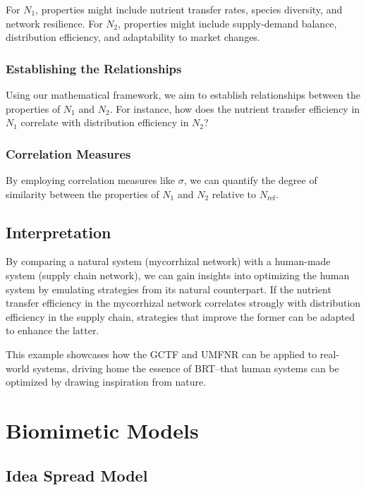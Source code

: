 \documentclass[sn-nature]{sn-jnl}%
\theoremstyle{thmstyleone}%
\theoremstyle{thmstyletwo}%
\theoremstyle{thmstylethree}%
\begin{document}
\begin{enumerate}
For \( N_1 \), properties might include nutrient transfer rates, species diversity, and network resilience.
For \( N_2 \), properties might include supply-demand balance, distribution efficiency, and adaptability to market changes.

\subsubsection*{Establishing the Relationships}

Using our mathematical framework, we aim to establish relationships between the properties of \( N_1 \) and \( N_2 \). For instance, how does the nutrient transfer efficiency in \( N_1 \) correlate with distribution efficiency in \( N_2 \)?

\subsubsection*{Correlation Measures}

By employing correlation measures like \( \sigma \), we can quantify the degree of similarity between the properties of \( N_1 \) and \( N_2 \) relative to \( N_{\text{ref}} \).

\subsection*{Interpretation}

By comparing a natural system (mycorrhizal network) with a human-made system (supply chain network), we can gain insights into optimizing the human system by emulating strategies from its natural counterpart. If the nutrient transfer efficiency in the mycorrhizal network correlates strongly with distribution efficiency in the supply chain, strategies that improve the former can be adapted to enhance the latter.

This example showcases how the GCTF and UMFNR can be applied to real-world systems, driving home the essence of BRT–that human systems can be optimized by drawing inspiration from nature.


\end{enumerate}



\appendix
\section{Biomimetic Models}

\subsection{Idea Spread Model} \label{A.1}
\end{document}
